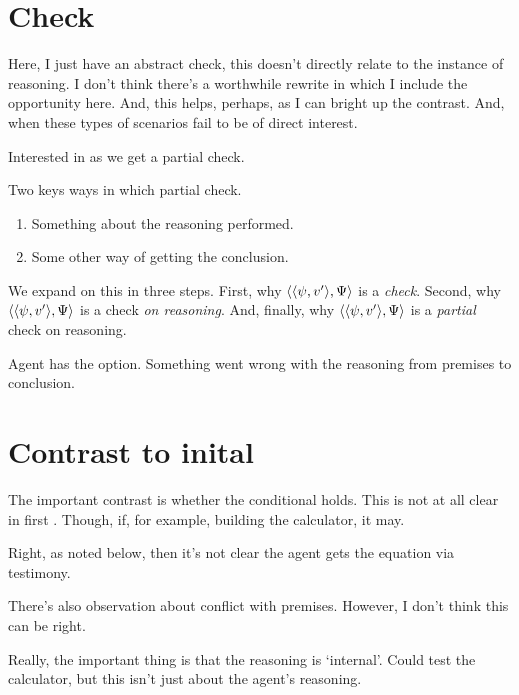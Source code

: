 \section{Check}
\label{sec:check}

\begin{note}
  \color{red}
  Here, I just have an abstract check, this doesn't directly relate to the instance of reasoning.
  I don't think there's a worthwhile rewrite in which I include the opportunity here.
  And, this helps, perhaps, as I can bright up the contrast.
  And, when these types of scenarios fail to be of direct interest.
\end{note}

\begin{note}
  Interested in  as we get a partial check.
\end{note}

\begin{note}
  Two keys ways in which partial check.
  \begin{enumerate}
  \item
    Something about the reasoning performed.
  \item
    Some other way of getting the conclusion.
  \end{enumerate}
\end{note}

\begin{note}
  We expand on this in three steps.
  First, why \(\langle \langle \psi, v' \rangle, \Psi \rangle\) is a \emph{check}.
  Second, why \(\langle \langle \psi, v' \rangle, \Psi \rangle\) is a check \emph{on reasoning}.
  And, finally, why \(\langle \langle \psi, v' \rangle, \Psi \rangle\) is a \emph{partial} check on reasoning.
\end{note}

\begin{note}[Check]
  Agent has the option.
  Something went wrong with the reasoning from premises to conclusion.
\end{note}

\section{Contrast to inital }

\begin{note}
  \color{blue}
  The important contrast is whether the conditional holds.
  This is not at all clear in first \scen{}.
  Though, if, for example, building the calculator, it may.

  Right, as noted below, then it's not clear the agent gets the equation via testimony.

  There's also observation about conflict with premises.
  However, I don't think this can be right.

  Really, the important thing is that the reasoning is `internal'.
  Could test the calculator, but this isn't just about the agent's reasoning.
\end{note}

